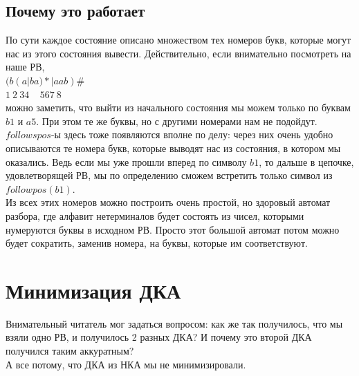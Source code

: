 \documentclass[14pt]{extreport}
\begin{document}
	\section{Почему это работает}
	По сути каждое состояние описано множеством тех номеров букв, которые могут нас из
	этого состояния вывести. Действительно, если внимательно посмотреть на наше РВ,\\
	$(b(a|ba)*|aab)\#$\\
	\hspace*{5pt}$1\ 2\ 34\ \ \ \ \ 567\ 8$\\
	можно заметить, что выйти из начального состояния мы можем только по буквам $b1$ и $a5$.
	При этом те же буквы, но с другими номерами нам не подойдут. $followspos$-ы здесь тоже
	появляются вполне по делу: через них очень удобно описываются те номера букв, которые выводят
	нас из состояния, в котором мы оказались. Ведь если мы уже прошли вперед по символу $b1$, то
	дальше в цепочке, удовлетворящей РВ, мы по определению сможем встретить только символ из
	$followpos(b1)$.\\
	Из всех этих номеров можно построить очень простой, но здоровый автомат разбора, где алфавит
	нетерминалов будет состоять из чисел, которыми нумеруются буквы в исходном РВ. Просто этот
	большой автомат потом можно будет сократить, заменив номера, на буквы, которые им
	соответствуют.
	\newpage
	\chapter{Минимизация ДКА}
	Внимательный читатель мог задаться вопросом: как же так получилось, что мы взяли
	одно РВ, и получилось 2 разных ДКА? И почему это второй ДКА получился таким аккуратным?\\
	А все потому, что ДКА из НКА мы не минимизировали.
\end{document}
